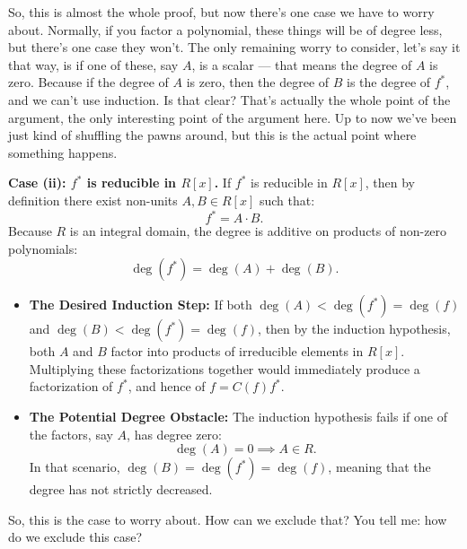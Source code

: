 \begin{proofWrapper}
\begin{speech}[00:27:36 - 00:29:34]
So, this is almost the whole proof, but now there's one case we have to worry about. Normally, if you factor a polynomial, these things will be of degree less, but there's one case they won't. The only remaining worry to consider, let's say it that way,  is if one of these, say $A$, is a scalar --- that means the degree of $A$ is zero.  Because if the degree of $A$ is zero, then the degree of $B$ is the degree of $f^*$, and we can't use induction. Is that clear? That's actually the whole point of the argument, the only interesting point of the argument here. Up to now we've been just kind of shuffling the pawns around, but this is the actual point where something happens.
\end{speech}

\begin{content}
\textbf{Case (ii): $f^*$ is reducible in $R[x]$.}
If $f^*$ is reducible in $R[x]$, then by definition there exist non-units $A, B \in R[x]$ such that:
\begin{equation}\label{eq:fstar-AB}
f^* = A \cdot B.
\end{equation}
Because $R$ is an integral domain, the degree is additive on products of non-zero polynomials:
\[
\deg(f^*) = \deg(A) + \deg(B).
\]
\begin{itemize}
    \item \textbf{The Desired Induction Step:} If both $\deg(A) < \deg(f^*) = \deg(f)$ and $\deg(B) < \deg(f^*) = \deg(f)$, then by the induction hypothesis, both $A$ and $B$ factor into products of irreducible elements in $R[x]$. Multiplying these factorizations together would immediately produce a factorization of $f^*$, and hence of $f = C(f) f^*$.
    \item \textbf{The Potential Degree Obstacle:} The induction hypothesis fails if one of the factors, say $A$, has degree zero:
    \[
    \deg(A) = 0 \implies A \in R.
    \]
    In that scenario, $\deg(B) = \deg(f^*) = \deg(f)$, meaning that the degree has not strictly decreased.
\end{itemize}
\end{content}

\begin{speech}[00:29:34 - 00:29:46]
So, this is the case to worry about. How can we exclude that? You tell me: how do we exclude this case?
\end{speech}


\end{proofWrapper}
